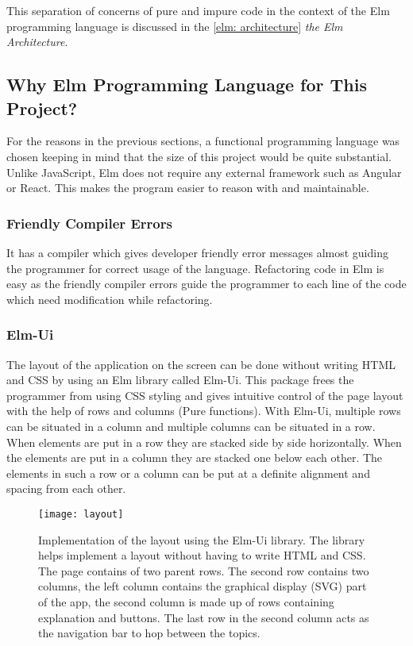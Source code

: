 This separation of concerns of pure and impure code in the context of the Elm
programming language is discussed in the \autoref{elm: architecture}
\emph{the Elm Architecture}.

\subsection{Why Elm Programming Language for This Project?}

For the reasons in the previous sections, a functional programming language was
chosen keeping in mind that the size of this project would be quite
substantial.  Unlike JavaScript, Elm does not require any external framework
such as Angular or React. This makes the program easier to reason with and
maintainable.

\subsubsection{Friendly Compiler Errors}
It has a compiler which gives developer friendly error messages almost guiding the
programmer for correct usage of the language. Refactoring code in Elm is easy
as the friendly compiler errors guide the programmer to each line of the code
which need modification while refactoring.

\subsubsection{Elm-Ui}
The layout of the application on the screen can be done without writing HTML
and CSS by using an Elm library called Elm-Ui. This package frees the
programmer from using CSS styling and gives intuitive control of the page
layout with the help of rows and columns (Pure functions). With Elm-Ui,
multiple rows can be situated in a column and multiple columns can be situated
in a row. When elements are put in a row they are stacked side by side
horizontally. When the elements are put in a column they are stacked one below
each other. The elements in such a row or a column can be put at a definite
alignment and spacing from each other.

\begin{figure}[!ht]
\centering
\texttt{[image: layout]}
\caption{
         Implementation of the layout using the Elm-Ui library. The library helps implement a layout without having to write HTML and CSS. The page contains of two parent
         rows. The second row contains two columns, the left column contains
         the graphical display (SVG) part of the app, the second column is made up of
         rows containing explanation and buttons. The last row in the second column
         acts as the navigation bar to hop between the topics.
        }
\end{figure}

